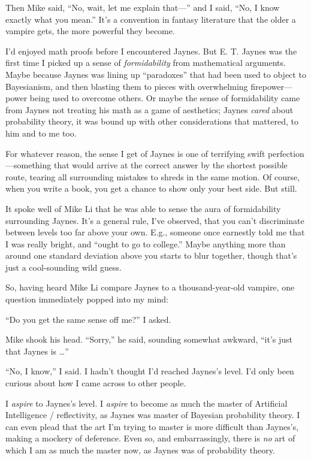 {
 Then Mike said, ``No, wait, let me explain
that---'' and I said, ``No, I know
exactly what you mean.'' It's a
convention in fantasy literature that the older a vampire gets, the
more powerful they become.}

{
 I'd enjoyed math proofs before I encountered
Jaynes. But E. T. Jaynes was the first time I picked up a sense of
\textit{formidability} from mathematical arguments. Maybe because
Jaynes was lining up ``paradoxes''
that had been used to object to Bayesianism, and then blasting them to
pieces with overwhelming firepower---power being used to overcome
others. Or maybe the sense of formidability came from Jaynes not
treating his math as a game of aesthetics; Jaynes \textit{cared} about
probability theory, it was bound up with other considerations that
mattered, to him and to me too.}

{
 For whatever reason, the sense I get of Jaynes is one of
terrifying swift perfection---something that would arrive at the
correct answer by the shortest possible route, tearing all surrounding
mistakes to shreds in the same motion. Of course, when you write a
book, you get a chance to show only your best side. But still.}

{
 It spoke well of Mike Li that he was able to sense the aura of
formidability surrounding Jaynes. It's a general rule,
I've observed, that you can't
discriminate between levels too far above your own. E.g., someone once
earnestly told me that I was really bright, and
``ought to go to college.'' Maybe
anything more than around one standard deviation above you starts to
blur together, though that's just a cool-sounding wild
guess.}

{
 So, having heard Mike Li compare Jaynes to a thousand-year-old
vampire, one question immediately popped into my mind:}

{
 ``Do you get the same sense off
me?'' I asked.}

{
 Mike shook his head. ``Sorry,''
he said, sounding somewhat awkward,
``it's just that Jaynes is
\ldots''}

{
 ``No, I know,'' I said. I
hadn't thought I'd reached
Jaynes's level. I'd only been curious
about how I came across to other people.}

{
 I \textit{aspire} to Jaynes's level. I
\textit{aspire} to become as much the master of Artificial Intelligence
/ reflectivity, as Jaynes was master of Bayesian probability theory. I
can even plead that the art I'm trying to master is
more difficult than Jaynes's, making a mockery of
deference. Even so, and embarrassingly, there is \textit{no} art of
which I am as much the master now, as Jaynes was of probability
theory.}

